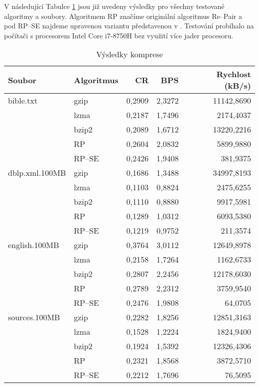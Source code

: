 \documentclass[a4paper,12pt]{article}
\begin{document}
V následující Tabulce \ref{tab:comp_result} jsou již uvedeny výsledky pro všechny testované algoritmy \linebreak a soubory. Algoritmem RP značíme originální algoritmus Re--Pair a pod RP--SE najdeme upravenou variantu představenou v \cite{bille2017space}. Testování probíhalo na počítači s procesorem Intel Core i7-8750H bez využití více jader procesoru.

\begin{table}
    \centering
    \begin{tabular}{l | l | r | r | r}
    \toprule
    Soubor          & Algoritmus & CR       & BPS       & Rychlost (kB/s)   \\\midrule
    bible.txt       & gzip       & 0,2909   & 2,3272    & 11142,8690        \\
                    & lzma       & 0,2187   & 1,7496    & 2174,4037         \\
                    & bzip2      & 0,2089   & 1,6712    & 13220,2216        \\
                    & RP         & 0,2604   & 2,0832    & 5899,9880         \\
                    & RP--SE     & 0,2426   & 1,9408    & 381,9375          \\\midrule
    dblp.xml.100MB  & gzip       & 0,1686   & 1,3488    & 34997,8193        \\
                    & lzma       & 0,1103   & 0,8824    & 2475,6255         \\
                    & bzip2      & 0,1110   & 0,8880    & 9917,5981         \\
                    & RP         & 0,1289   & 1,0312    & 6093,5380         \\
                    & RP--SE     & 0,1219   & 0,9752    & 211,3574          \\\midrule
    english.100MB   & gzip       & 0,3764   & 3,0112    & 12649,8978        \\
                    & lzma       & 0,2158   & 1,7264    & 1162,6733         \\
                    & bzip2      & 0,2807   & 2,2456    & 12178,6030        \\
                    & RP         & 0,2789   & 2,2312    & 3759,9540         \\
                    & RP--SE     & 0,2476   & 1,9808    & 64,0705           \\\midrule
    sources.100MB   & gzip       & 0,2282   & 1,8256    & 12851,3163        \\
                    & lzma       & 0,1528   & 1,2224    & 1824,9400         \\
                    & bzip2      & 0,1924   & 1,5392    & 12326,4306        \\
                    & RP         & 0,2321   & 1,8568    & 3872,5710          \\
                    & RP--SE     & 0,2212   & 1,7696    & 76,5095          \\
    \bottomrule
    \end{tabular}
    \caption{Výsledky komprese}
    \label{tab:comp_result}
\end{table}
\end{document}
